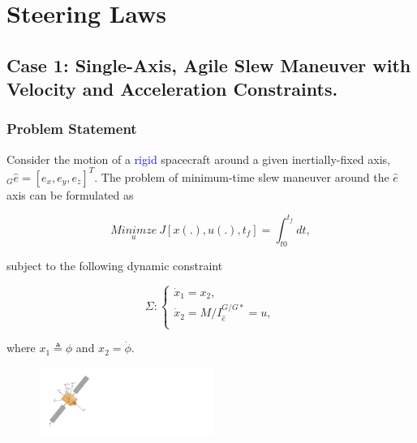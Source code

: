 \documentclass[letterpaper, preprint, paper,11pt]{AAS}	%
\begin{document}

\section{Steering Laws} 

	\subsection{Case 1: Single-Axis, Agile Slew Maneuver with Velocity and Acceleration Constraints.}	 
	
	
		\subsubsection{Problem Statement}
		
			Consider the motion of a \textcolor{blue}{rigid} spacecraft around a given inertially-fixed axis, $_G\hat{e}=[e_x,e_y,e_z]^T$. The problem of minimum-time slew maneuver around the $\hat{e}$ axis can be formulated as
			
			\begin{equation}\label{costfunction}
				\underset{u}{Minimze}\ J[x(.), u(.), t_f]=\int_{t0}^{t_f} dt,
			\end{equation}
			
			subject to the following dynamic constraint
			
			\begin{equation}\label{system}
				\Sigma:\left\{
				\begin{array}{l}
				\dot{x}_1=x_2, \\
				\dot{x}_2=M/I_{\hat{e}}^{G/G*}=u, \\
				\end{array}
				\right.
			\end{equation}
			
			where $x_1 \triangleq\phi$ and $x_2=\dot{\phi}$. 
			
			\begin{figure}[H]
				\begin{center}
				\includegraphics[width=2.25in]{./Figures/Spacecraft}  
				\end{center}    
			\end{figure}
		
\end{document}
